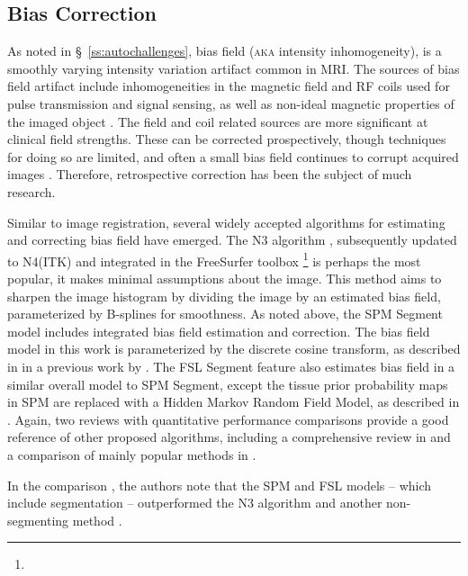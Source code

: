 \subsection{Bias Correction}\label{ss:meth-bias}
As noted in \S\ \ref{ss:autochallenges}, bias field (\textsc{aka} intensity inhomogeneity), is a smoothly varying intensity variation artifact common in MRI.
The sources of bias field artifact include inhomogeneities in the magnetic field and RF coils used for pulse transmission and signal sensing, as well as non-ideal magnetic properties of the imaged object \cite{Vovk2007}.
The field and coil related sources are more significant at clinical field strengths.
These can be corrected prospectively, though techniques for doing so are limited, and often a small bias field continues to corrupt acquired images \cite{Vovk2007}.
Therefore, retrospective correction has been the subject of much research.
\par
Similar to image registration, several widely accepted algorithms for estimating and correcting bias field have emerged.
The N3 algorithm \cite{Sled1998}, subsequently updated to N4(ITK) \cite{Tustison2010} and integrated in the FreeSurfer toolbox%
\footnote{}
is perhaps the most popular, it makes minimal assumptions about the image.
This method aims to sharpen the image histogram by dividing the image by an estimated bias field, parameterized by B-splines for smoothness.
As noted above, the SPM Segment model \cite{Ashburner2005} includes integrated bias field estimation and correction.
The bias field model in this work is parameterized by the discrete cosine transform, as described in in a previous work by \citeauthor{Ashburner2005} \cite{Ashburner1999}.
The FSL Segment feature also estimates bias field in a similar overall model to SPM Segment, except the tissue prior probability maps in SPM are replaced with a Hidden Markov Random Field Model, as described in \cite{Zhang2001}.
Again, two reviews with quantitative performance comparisons provide a good reference of other proposed algorithms, including a comprehensive review in \citeyear{Belaroussi2006} \cite{Belaroussi2006} and a comparison of mainly popular methods in \citeyear{Ganzetti2016} \cite{Ganzetti2016}.
\par
In the \citeyear{Ganzetti2016} comparison \cite{Ganzetti2016}, the authors note that the SPM and FSL models -- which include segmentation -- outperformed the N3 algorithm \cite{Sled1998} and another non-segmenting method \cite{Dawant1993}.
